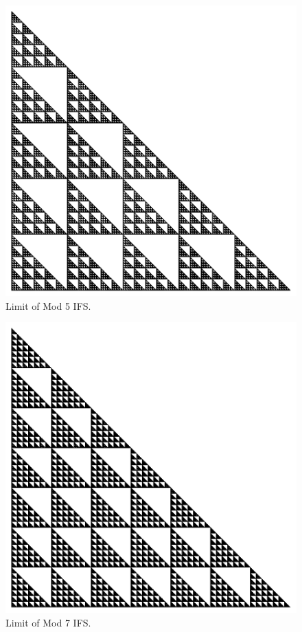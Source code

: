\documentclass{beamer}
\begin{document}
\begin{frame}
    \begin{figure}
        \centering
        \includegraphics[scale=0.5]{GlobalMod5}
        \caption{Limit of Mod 5 IFS.}
    \end{figure}
\end{frame}

\begin{frame}
    \begin{figure}
        \centering
        \includegraphics[scale=0.5]{GlobalMod7}
        \caption{Limit of Mod 7 IFS.}
    \end{figure}
\end{frame}
\end{document}
